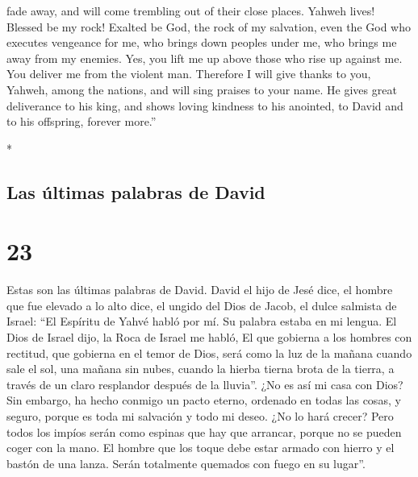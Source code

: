\begin{paracol}{2}
\begin{otherlanguage}{english}
fade away, and will come trembling out of their close places.
 Yahweh lives! Blessed be my rock! Exalted be God, the
rock of my salvation,  even the God who executes
vengeance for me, who brings down peoples under me,  who
brings me away from my enemies. Yes, you lift me up above those who rise
up against me. You deliver me from the violent man. 
Therefore I will give thanks to you, Yahweh, among the nations, and will
sing praises to your name.  He gives great deliverance to
his king, and shows loving kindness to his anointed, to David and to his
offspring, forever more.''

\end{otherlanguage}

\switchcolumn[0]*

\hypertarget{las-uxfaltimas-palabras-de-david}{%
\subsection{Las últimas palabras de
David}\label{las-uxfaltimas-palabras-de-david}}

\hypertarget{section-44}{%
\section{23}\label{section-44}}

 Estas son las últimas palabras de David. David el hijo de
Jesé dice, el hombre que fue elevado a lo alto dice, el ungido del Dios
de Jacob, el dulce salmista de Israel:  ``El Espíritu de
Yahvé habló por mí. Su palabra estaba en mi lengua.  El
Dios de Israel dijo, la Roca de Israel me habló, El que gobierna a los
hombres con rectitud, que gobierna en el temor de Dios, 
será como la luz de la mañana cuando sale el sol, una mañana sin nubes,
cuando la hierba tierna brota de la tierra, a través de un claro
resplandor después de la lluvia''.  ¿No es así mi casa con
Dios? Sin embargo, ha hecho conmigo un pacto eterno, ordenado en todas
las cosas, y seguro, porque es toda mi salvación y todo mi deseo. ¿No lo
hará crecer?  Pero todos los impíos serán como espinas que
hay que arrancar, porque no se pueden coger con la mano. 
El hombre que los toque debe estar armado con hierro y el bastón de una
lanza. Serán totalmente quemados con fuego en su lugar''.

\hypertarget{directorio-y-hazauxf1as-de-los-guerreros-de-david}{%
}
\end{paracol}

